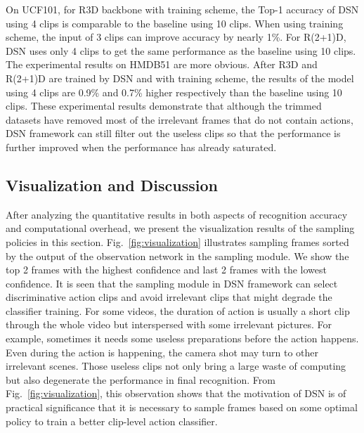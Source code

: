\documentclass[journal]{IEEEtran}
\begin{document}
On UCF101, for R3D backbone with  training scheme, the Top-1 accuracy of DSN using 4 clips is comparable to the baseline using 10 clips.
When using  training scheme, the input of 3 clips can improve accuracy by nearly 1\%.
For R(2+1)D, DSN uses only 4 clips to get the same performance as the baseline using 10 clips.
The experimental results on HMDB51 are more obvious.
After R3D and R(2+1)D are trained by DSN and with  training scheme, the results of the model using 4 clips are 0.9\% and 0.7\% higher respectively than the baseline using 10 clips. These experimental results demonstrate that although the trimmed datasets have removed most of the irrelevant frames that do not contain actions, DSN framework can still filter out the useless clips so that the performance is further improved when the performance has already saturated.




\subsection{Visualization and Discussion}
After analyzing the quantitative results in both aspects of recognition accuracy and computational overhead, we present the visualization results of the sampling policies in this section.
Fig.~\ref{fig:visualization} illustrates sampling frames sorted by the output of the observation network in the sampling module.
We show the top 2 frames with the highest confidence and last 2 frames with the lowest confidence.
It is seen that the sampling module in DSN framework can select discriminative action clips and avoid irrelevant clips that might degrade the classifier training.
For some videos, the duration of action is usually a short clip through the whole video but interspersed with some irrelevant pictures.
For example, sometimes it needs some useless preparations before the action happens.
Even during the action is happening, the camera shot may turn to other irrelevant scenes.
Those useless clips not only bring a large waste of computing but also degenerate the performance in final recognition.
From Fig.~\ref{fig:visualization}, this observation shows that the motivation of DSN is of practical significance that it is necessary to sample frames based on some optimal policy to train a better clip-level action classifier.
\end{document}
